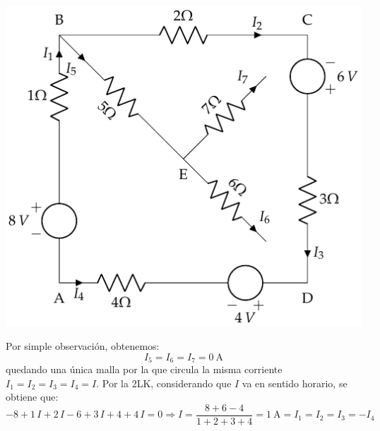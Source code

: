 \begin{center}
  \includegraphics{figuras/BT1_09_sol.pdf}
\end{center}

Por simple observación, obtenemos:
\begin{equation*}
  I_5=I_6=I_7=\qty{0}{\ampere}
\end{equation*}
quedando una única malla por la que circula la misma corriente
$I_1=I_2=I_3=I_4=I$. Por la 2LK, considerando que $I$ va en sentido
horario, se obtiene que:
\begin{equation*}
  -8+1\, I+2\,I-6+3\,I+4+4\,I=0\Rightarrow {I = \dfrac{8+6-4}{1+2+3+4}=\qty{1}{\ampere}=I_1=I_2=I_3=-I_4}
\end{equation*}


